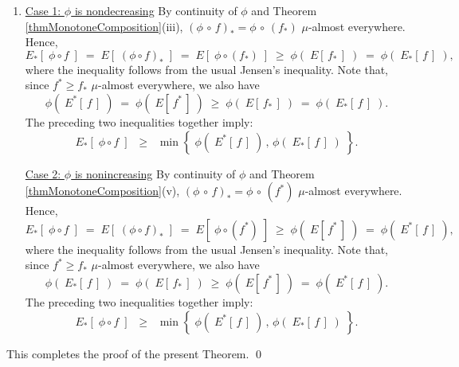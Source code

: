 \begin{enumerate}
\item
	\underline{Case 1: $\phi$ is nondecreasing}
	\vskip 0.0cm
	\noindent
	By continuity of $\phi$ and Theorem \ref{thmMonotoneComposition}(iii),
	$(\phi\,\circ\,f)_{*} = \phi\,\circ\,(f_{*})$ $\mu$-almost everywhere.
	Hence,
	\begin{equation*}
	E_{*}\!\left[\;\phi \circ f\;\right]
		\;=\; E\!\left[\;(\phi \circ f)_{*}\;\right]
		\;=\; E\!\left[\;\phi \circ (f_{*})\;\right]
		\;\geq\; \phi(\;E[\,f_{*}\,]\;)
		\;=\; \phi(\;E_{*}[\,f\,]\;),
	\end{equation*}
	where the inequality follows from the usual Jensen's inequality.
	Note that, since $f^{*} \geq f_{*}$ $\mu$-almost everywhere, we also have
	\begin{equation*}
	\phi(\;E^{*}[\,f\,]\;)
		\;=\; \phi(\;E[\,f^{*}\,]\;)
		\;\geq\; \phi(\;E[\,f_{*}\,]\;)
		\;=\; \phi(\;E_{*}[\,f\,]\;).
	\end{equation*}
	The preceding two inequalities together imply:
	\begin{equation*}
	E_{*}\!\left[\;\phi \circ f\;\right]
		\;\;\geq\;\; \min\!\left\{\;\phi(\;E^{*}[\,f\,]\;) \,,\, \phi(\;E_{*}[\,f\,]\;)\;\right\}.
	\end{equation*}

	\underline{Case 2: $\phi$ is nonincreasing}
	\vskip 0.0cm
	\noindent
	By continuity of $\phi$ and Theorem \ref{thmMonotoneComposition}(v),
	$(\phi\,\circ\,f)_{*} = \phi\,\circ\,(f^{*})$ $\mu$-almost everywhere.
	Hence,
	\begin{equation*}
	E_{*}\!\left[\;\phi \circ f\;\right]
		\;=\; E\!\left[\;(\phi \circ f)_{*}\;\right]
		\;=\; E\!\left[\;\phi \circ (f^{*})\;\right]
		\;\geq\; \phi(\;E[\,f^{*}\,]\;)
		\;=\; \phi(\;E^{*}[\,f\,]\;),
	\end{equation*}
	where the inequality follows from the usual Jensen's inequality.
	Note that, since $f^{*} \geq f_{*}$ $\mu$-almost everywhere, we also have
	\begin{equation*}
	\phi(\;E_{*}[\,f\,]\;)
		\;=\; \phi(\;E[\,f_{*}\,]\;)
		\;\geq\; \phi(\;E[\,f^{*}\,]\;)
		\;=\; \phi(\;E^{*}[\,f\,]\;).
	\end{equation*}
	The preceding two inequalities together imply:
	\begin{equation*}
	E_{*}\!\left[\;\phi \circ f\;\right]
		\;\;\geq\;\; \min\!\left\{\;\phi(\;E^{*}[\,f\,]\;) \,,\, \phi(\;E_{*}[\,f\,]\;)\;\right\}.
	\end{equation*}
\end{enumerate}
This completes the proof of the present Theorem.
\qed



\renewcommand{\theenumi}{\roman{enumi}}
\renewcommand{\labelenumi}{\textnormal{(\theenumi)}$\;\;$}

